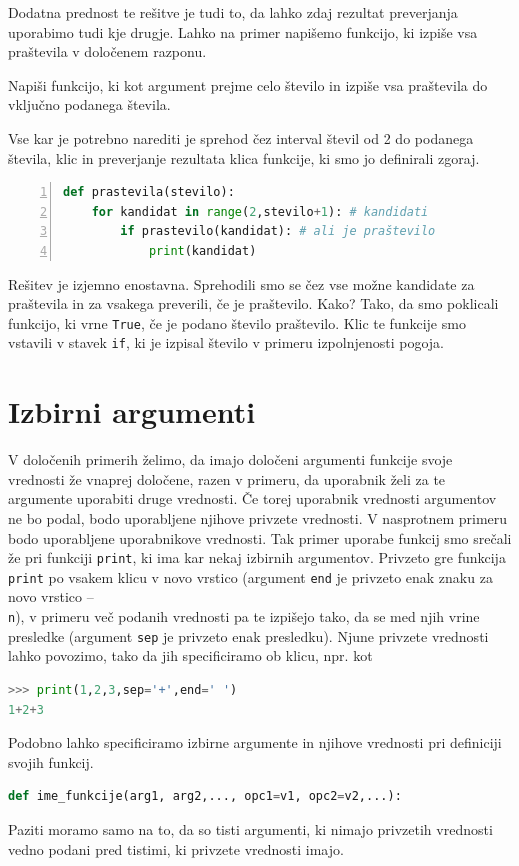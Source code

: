 Dodatna prednost te rešitve je tudi to, da lahko zdaj rezultat preverjanja uporabimo tudi kje drugje. Lahko na primer napišemo funkcijo, ki izpiše vsa praštevila v določenem razponu.
\begin{zgled}
Napiši funkcijo, ki kot argument prejme celo število in izpiše vsa praštevila do vključno podanega števila.
\end{zgled}
\begin{resitev}
Vse kar je potrebno narediti je sprehod čez interval števil od 2 do podanega števila, klic in preverjanje rezultata klica funkcije, ki smo jo definirali zgoraj.
\begin{lstlisting}[language=Python,numbers=left]
def prastevila(stevilo):
    for kandidat in range(2,stevilo+1): # kandidati
        if prastevilo(kandidat): # ali je praštevilo
            print(kandidat)
\end{lstlisting}
\end{resitev}
Rešitev je izjemno enostavna. Sprehodili smo se čez vse možne kandidate za praštevila in za vsakega preverili, če je praštevilo. Kako? Tako, da smo poklicali funkcijo, ki vrne \texttt{True}, če je podano število praštevilo. Klic te funkcije smo vstavili v stavek \texttt{if}, ki je izpisal število v primeru izpolnjenosti pogoja.

\section{Izbirni argumenti}
V določenih primerih želimo, da imajo določeni argumenti funkcije svoje vrednosti že vnaprej določene, razen v primeru, da uporabnik želi za te argumente uporabiti druge vrednosti. Če torej uporabnik vrednosti argumentov ne bo podal, bodo uporabljene njihove privzete vrednosti. V nasprotnem primeru bodo uporabljene uporabnikove vrednosti. Tak primer uporabe funkcij smo srečali že pri funkciji \texttt{print}, ki ima kar nekaj izbirnih argumentov. Privzeto gre funkcija \texttt{print} po vsakem klicu v novo vrstico (argument \texttt{end} je privzeto enak znaku za novo vrstico -- \texttt{\\n}), v primeru več podanih vrednosti pa te izpišejo tako, da se med njih vrine presledke (argument \texttt{sep} je privzeto enak presledku). Njune privzete vrednosti lahko povozimo, tako da jih specificiramo ob klicu, npr. kot
\begin{lstlisting}[language=Python]
>>> print(1,2,3,sep='+',end=' ')
1+2+3
\end{lstlisting}
Podobno lahko specificiramo izbirne argumente in njihove vrednosti pri definiciji svojih funkcij. 
\begin{lstlisting}[language=Python]
def ime_funkcije(arg1, arg2,..., opc1=v1, opc2=v2,...):
\end{lstlisting}
Paziti moramo samo na to, da so tisti argumenti, ki nimajo privzetih vrednosti vedno podani pred tistimi, ki privzete vrednosti imajo.


